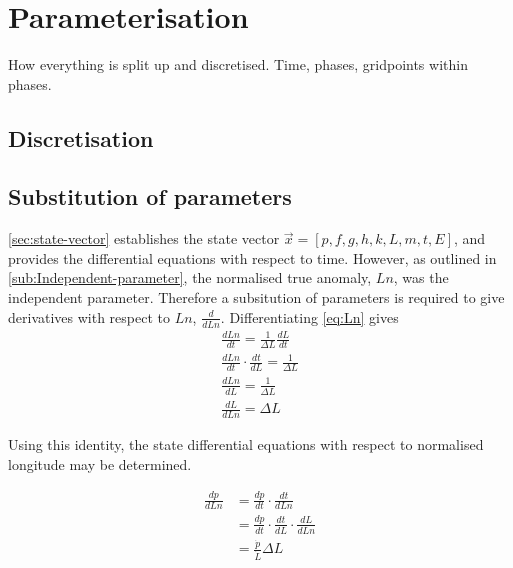 \section{Parameterisation}

How everything is split up and discretised. Time, phases, gridpoints within phases. 

\subsection{Discretisation}

\subsection{Substitution of parameters}\label{sub:subst-param}

\autoref{sec:state-vector} establishes the state vector $\vec{x}=[p,f,g,h,k,L,m,t,E]$, and provides the differential equations with respect to time. However, as outlined in \autoref{sub:Independent-parameter}, the normalised true anomaly, $Ln$, was the independent parameter. Therefore a subsitution of parameters is required to give derivatives with respect to $Ln$, $\frac{d}{dLn}$. Differentiating \autoref{eq:Ln} gives
\begin{subequations}
\begin{gather}
\frac{dLn}{dt}=\frac{1}{\Delta L}\frac{dL}{dt} \\
\frac{dLn}{dt}\cdot\frac{dt}{dL}=\frac{1}{\Delta L} \\
\frac{dLn}{dL}=\frac{1}{\Delta L} \\
\frac{dL}{dLn}=\Delta L
\end{gather}
\end{subequations}

Using this identity, the state differential equations with respect to normalised longitude may be determined.

\begin{subequations}
\begin{align}
\frac{dp}{dLn}&=\frac{dp}{dt}\cdot\frac{dt}{dLn}\\
&=\frac{dp}{dt}\cdot\frac{dt}{dL}\cdot\frac{dL}{dLn}\\
&=\frac{\dot{p}}{\dot{L}}\Delta L
\end{align}
\end{subequations}

